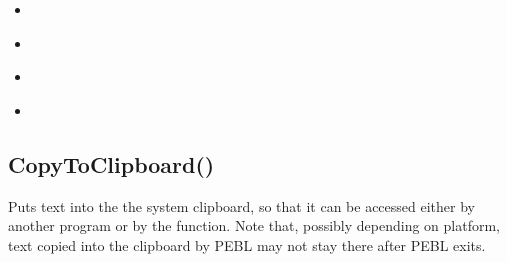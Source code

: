 \documentclass[letterpaper,10pt,english]{sphinxmanual}
\begin{document}
\begin{sphinxShadowBox}
\begin{itemize}
\item {} 
\sphinxAtStartPar
{}\label{\detokenize{reference/peblstring:id11}}{\hyperref[\detokenize{reference/peblstring:isrtl}]{}}

\item {} 
\sphinxAtStartPar
{}\label{\detokenize{reference/peblstring:id12}}{\hyperref[\detokenize{reference/peblstring:getfontfortext}]{}}

\item {} 
\sphinxAtStartPar
{}\label{\detokenize{reference/peblstring:id13}}{\hyperref[\detokenize{reference/peblstring:getsystemlocale}]{}}

\item {} 
\sphinxAtStartPar
{}\label{\detokenize{reference/peblstring:id14}}{\hyperref[\detokenize{reference/peblstring:issystemlocalertl}]{}}

\end{itemize}
\end{sphinxShadowBox}

\ignorespaces 

\subsection{CopyToClipboard()}
\label{\detokenize{reference/peblstring:copytoclipboard}}\label{\detokenize{reference/peblstring:index-0}}
\sphinxAtStartPar
{}

\sphinxAtStartPar
{}

\sphinxAtStartPar
Puts text into the the system clipboard, so that it can be accessed either by another program or by the  function. Note that, possibly depending on platform, text copied into the clipboard by PEBL may not stay there after PEBL exits.

\sphinxAtStartPar
{}

\begin{sphinxVerbatim}[commandchars=\\\{\}]
\end{sphinxVerbatim}
\end{document}
